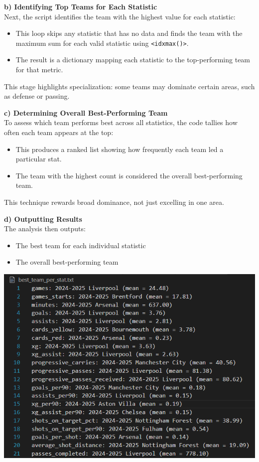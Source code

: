 \documentclass[a4paper,12pt]{article}
\begin{document}
\textbf{b) Identifying Top Teams for Each Statistic} \\
Next, the script identifies the team with the highest value for each statistic:
\begin{itemize}
    \item This loop skips any statistic that has no data and finds the team with the maximum sum for each valid statistic using \texttt{<idxmax()>}.
    \item The result is a dictionary mapping each statistic to the top-performing team for that metric.
\end{itemize}
This stage highlights specialization: some teams may dominate certain areas, such as defense or passing.

\textbf{c) Determining Overall Best-Performing Team} \\
To assess which team performs best across all statistics, the code tallies how often each team appears at the top:
\begin{itemize}
    \item This produces a ranked list showing how frequently each team led a particular stat.
    \item The team with the highest count is considered the overall best-performing team.
\end{itemize}
This technique rewards broad dominance, not just excelling in one area.

\textbf{d) Outputting Results} \\
The analysis then outputs:
\begin{itemize}
    \item The best team for each individual statistic
    \item The overall best-performing team
\end{itemize}

\includegraphics[width=1\textwidth]{best_team.png}
\end{document}
